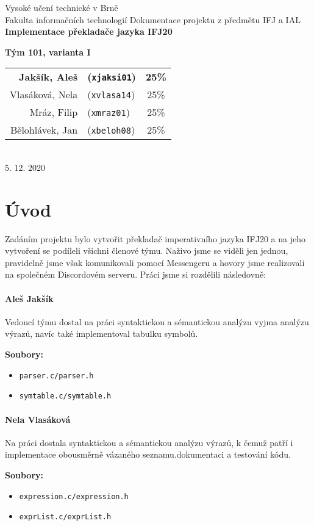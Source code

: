 \documentclass[czech,a4paper,12pt]{article}[]
\begin{document}
    \begin{center}
        \LARGE{Vysoké učení technické v Brně \\
        Fakulta informačních technologií}
        \vfill 
        \LARGE{Dokumentace projektu z předmětu IFJ a IAL}\\
        \Huge{\textbf{Implementace překladače jazyka IFJ20}}\\
        \vfill
        \large{\textbf{Tým 101, varianta I}\\
        \begin{tabular}{ r l c}
            \textbf{Jakšík, Aleš} & \textbf{(\texttt{xjaksi01})} & \textbf{25\%} \\ 
            Vlasáková, Nela & (\texttt{xvlasa14}) & 25\% \\  
            Mráz, Filip & (\texttt{xmraz01}) & 25\% \\
            Bělohlávek, Jan & (\texttt{xbeloh08}) & 25\% 
        \end{tabular}
        }\\[3em]
        5. 12. 2020
    \end{center}
    \newpage
    \tableofcontents
    \newpage
    \section{Úvod}
    Zadáním projektu bylo vytvořit překladač imperativního jazyka IFJ20 a na jeho vytvoření se podíleli všichni členové týmu. Naživo jsme se viděli jen jednou, pravidelně jsme však komunikovali pomocí Messengeru a hovory jsme realizovali na společném Discordovém serveru. Práci jsme si rozdělili následovně:
    \paragraph{Aleš Jakšík}
    \begin{inpar}
        Vedoucí týmu dostal na práci syntaktickou a sémantickou analýzu vyjma analýzu výrazů, navíc také implementoval tabulku symbolů.

        \medskip
        \textbf{Soubory:}
        \begin{itemize}
            \item \texttt{parser.c/parser.h}
            \item \texttt{symtable.c/symtable.h}
        \end{itemize}
    \end{inpar}
    \paragraph{Nela Vlasáková}
    \begin{inpar}
        Na práci dostala syntaktickou a sémantickou analýzu výrazů, k čemuž patří i implementace obousměrně vázaného seznamu.dokumentaci a testování kódu.

        \medskip
        \textbf{Soubory:}
        \begin{itemize}
            \item \texttt{expression.c/expression.h}
            \item \texttt{exprList.c/exprList.h}
        \end{itemize}
    \end{inpar}    
\end{document}
